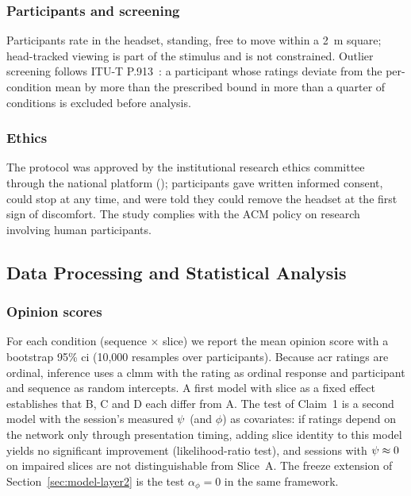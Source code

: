 \subsubsection{Participants and screening}
 Participants rate in the
headset, standing, free to move within a \SI{2}{\metre} square;
head-tracked viewing is part of the stimulus and is not constrained.
Outlier screening follows ITU-T P.913~\cite{p913}: a participant whose
ratings deviate from the per-condition mean by more than the
prescribed bound in more than a quarter of conditions is excluded
before analysis.

\subsubsection{Ethics}
The protocol was approved by the institutional research ethics
committee through the national platform
(); participants gave written informed consent, could
stop at any time, and were told they could remove the headset at the
first sign of discomfort. The study complies with the ACM policy on
research involving human participants.

\subsection{Data Processing and Statistical Analysis}
\label{sec:design-analysis}

\subsubsection{Opinion scores}
For each condition (sequence $\times$ slice) we report the mean
opinion score with a bootstrap 95\% \gls{ci} (10,000 resamples over
participants). Because \gls{acr} ratings are ordinal, inference uses a
\gls{clmm} with the rating as ordinal response and participant and
sequence as random intercepts. A first model with slice as a fixed
effect establishes that B, C and D each differ from A. The test of
Claim~1 is a second model with the session's measured $\psi$ (and
$\phi$) as covariates: if ratings depend on the network only through
presentation timing, adding slice identity to this model yields no
significant improvement (likelihood-ratio test), and sessions with
$\psi \approx 0$ on impaired slices are not distinguishable from
Slice~A. The freeze extension of Section~\ref{sec:model-layer2} is
the test $\alpha_\phi = 0$ in the same framework.

